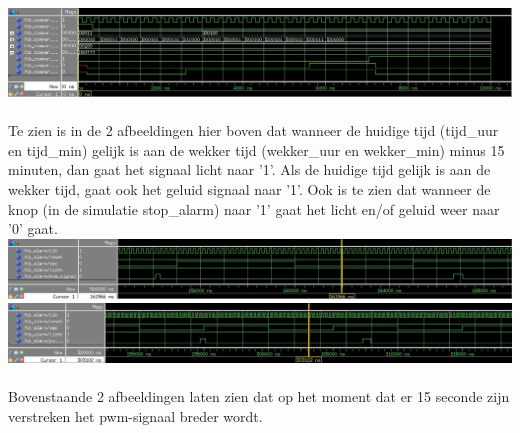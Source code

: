 \includegraphics[width=\textwidth,height=\textheight,keepaspectratio]{results/compare_ext.jpg}
\\
\\
Te zien is in de 2 afbeeldingen hier boven dat wanneer de huidige tijd (tijd\_uur en tijd\_min) gelijk is aan de wekker tijd (wekker\_uur en wekker\_min) minus 15 minuten, dan gaat het signaal licht naar '1'. Als de huidige tijd gelijk is aan de wekker tijd, gaat ook het geluid signaal naar '1'.
Ook is te zien dat wanneer de knop (in de simulatie stop\_alarm) naar '1' gaat het licht en/of geluid weer naar '0' gaat.
\\

\includegraphics[width=\textwidth,height=\textheight,keepaspectratio]{results/alarm.jpg}
\\

\includegraphics[width=\textwidth,height=\textheight,keepaspectratio]{results/alarm_ext.jpg}
\\
\\
Bovenstaande 2 afbeeldingen laten zien dat op het moment dat er 15 seconde zijn verstreken het pwm-signaal breder wordt.
